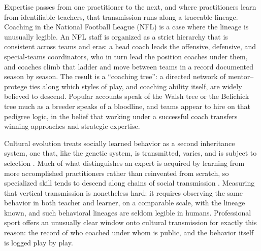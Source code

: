 \documentclass[
  journal=ehs,
  manuscript=article,
  year=2026,
  volume=8,
]{cup-journal}
\begin{document}
Expertise passes from one practitioner to the next, and where practitioners learn
from identifiable teachers, that transmission runs along a traceable lineage. Coaching
in the National Football League (NFL) is a case where the lineage is unusually
legible. An NFL staff is organized as a strict hierarchy that is consistent across
teams and eras: a head coach leads the offensive, defensive, and special-teams
coordinators, who in turn lead the position coaches under them, and coaches climb that
ladder and move between teams in a record documented season by season. The result is a
``coaching tree'': a directed network of mentor--protege ties along which styles of
play, and coaching ability itself, are widely believed to descend. Popular accounts
speak of the Walsh tree or the Belichick tree much as a breeder speaks of a bloodline,
and teams appear to hire on that pedigree logic, in the belief that working under a
successful coach transfers winning approaches and strategic expertise.

Cultural evolution treats socially learned behavior as a second inheritance system,
one that, like the genetic system, is transmitted, varies, and is subject to
selection \parencite{cavallisforza1981, boydricherson1985, henrich2016}. Much of what
distinguishes an expert is acquired by learning from more accomplished practitioners
rather than reinvented from scratch, so specialized skill tends to descend along
chains of social transmission \parencite{henrich2016}. Measuring that vertical
transmission is nonetheless hard: it requires observing the same behavior in both
teacher and learner, on a comparable scale, with the lineage known, and such
behavioral lineages are seldom legible in humans. Professional sport offers an
unusually clear window onto cultural transmission for exactly this reason: the record
of who coached under whom is public, and the behavior itself is logged play by play.
\end{document}
